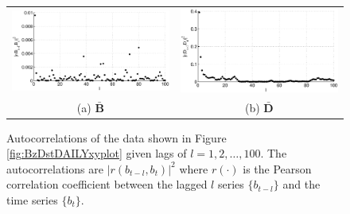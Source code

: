 \documentclass{article}[10pt]
\begin{document}
\begin{figure}[ht]
\begin{tabular}{cc}
\includegraphics[scale=0.48]{SolarExample_autocorrBzdaily.eps} & \includegraphics[scale=0.48]{SolarExample_autocorrDdaily.eps} \\
(a) $\bar{\mathbf{B}}$ & (b) $\bar{\mathbf{D}}$
\end{tabular}
\caption{Autocorrelations of the data shown in Figure \ref{fig:BzDstDAILYxyplot} given lags of $l=1,2,\ldots,100$.  The autocorrelations are $|r(b_{t-l},b_t)|^2$ where $r(\cdot)$ is the Pearson correlation coefficient between the lagged $l$ series $\{b_{t-l}\}$ and the time series $\{b_{t}\}$.}
\label{fig:BzDstDAILYxyautocorr}
\end{figure}
\end{document}
